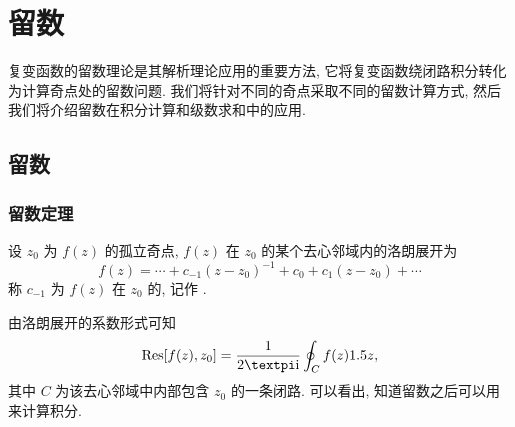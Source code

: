 \chapter{留数}
\label{chapter:5}

复变函数的留数理论是其解析理论应用的重要方法, 它将复变函数绕闭路积分转化为计算奇点处的留数问题.
我们将针对不同的奇点采取不同的留数计算方式, 然后我们将介绍留数在积分计算和级数求和中的应用.



\section{留数}

\subsection{留数定理}

\begin{definition}
  设 $z_0$ 为 $f(z)$ 的孤立奇点, $f(z)$ 在 $z_0$ 的某个去心邻域内的洛朗展开为
  \[
    f(z)=\cdots+c_{-1}(z-z_0)^{-1}+c_0+c_1(z-z_0)+\cdots
  \]
  称 $c_{-1}$ 为 $f(z)$ 在 $z_0$ 的, 记作 \nouns{$\Res[f(z),z_0]$}.
\end{definition}

由洛朗展开的系数形式可知
\[
   \Res[f(z),z_0]
  =\frac1{2\cpi\ii}\oint_C f(z)\d z,
\]
其中 $C$ 为该去心邻域中内部包含 $z_0$ 的一条闭路.
可以看出, 知道留数之后可以用来计算积分.

